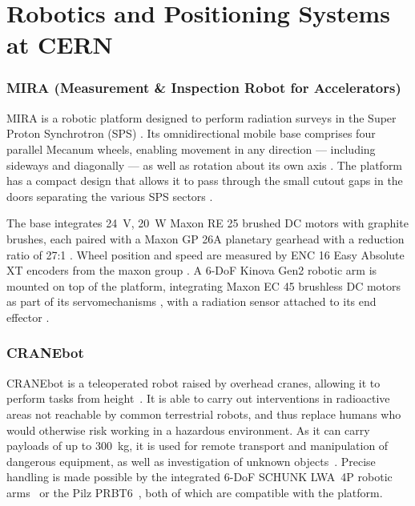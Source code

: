 \section{Robotics and Positioning Systems at CERN}
\label{sec:state-of-the-art-application-context}

\subsubsection*{MIRA (Measurement \& Inspection Robot for Accelerators)}
MIRA is a robotic platform designed to perform radiation surveys in the Super Proton Synchrotron (SPS) \cite{forkel2022telerobotic,forkel2025mira}. Its omnidirectional mobile base comprises four parallel Mecanum wheels, enabling movement in any direction — including sideways and diagonally — as well as rotation about its own axis \cite{prados2021omnidirectional,forkel2025mira}. The platform has a compact design that allows it to pass through the small cutout gaps in the doors separating the various SPS sectors \cite{prados2021omnidirectional,forkel2022telerobotic}.

The base integrates 24~V, 20~W Maxon RE 25 brushed DC motors with graphite brushes, each paired with a Maxon GP 26A planetary gearhead with a reduction ratio of 27:1 \cite{prados2021omnidirectional}. Wheel position and speed are measured by ENC 16 Easy Absolute XT encoders from the maxon group \cite{forkel2025mira}. A 6-DoF Kinova Gen2 robotic arm is mounted on top of the platform, integrating Maxon EC 45 brushless DC motors as part of its servomechanisms \cite{maxon2015jaco2}, with a radiation sensor attached to its end effector \cite{forkel2022telerobotic,forkel2025mira}.

\subsubsection*{CRANEbot}
CRANEbot is a teleoperated robot raised by overhead cranes, allowing it to perform tasks from height~\cite{dago2024cranebotteleoperated}. It is able to carry out interventions in radioactive areas not reachable by common terrestrial robots, and thus replace humans who would otherwise risk working in a hazardous environment. As it can carry payloads of up to 300~kg, it is used for remote transport and manipulation of dangerous equipment, as well as investigation of unknown objects~\cite{dago2024cranebotteleoperated, dago2024modelling}. Precise handling is made possible by the integrated 6-DoF SCHUNK LWA~4P robotic arms~\cite{schunklwa4p} or the Pilz PRBT6~\cite{pilzprbt6}, both of which are compatible with the platform.

